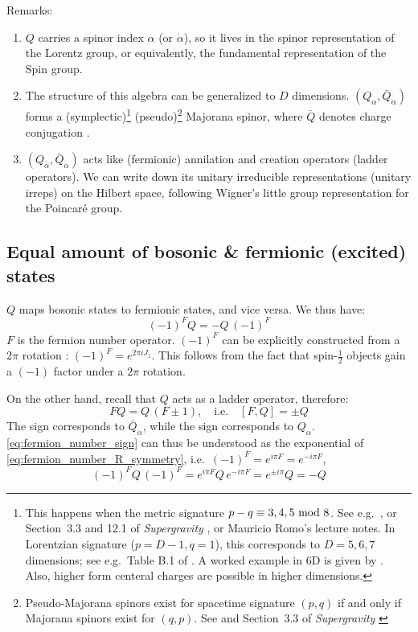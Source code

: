 \documentclass[a4paper
	,10pt
]{article}
\begin{document}
	Remarks:
	\begin{enumerate}
	\item $Q$ carries a spinor index $\alpha$ (or $\dot{\alpha}$), so it lives in the spinor representation of the Lorentz group, or equivalently, the fundamental representation of the Spin group. 
	
	\item The structure of this algebra can be generalized to $D$ dimensions. $(Q_\alpha, \bar{Q}_{\dot{\alpha}})$ forms a \mbox{(symplectic)}\footnote{
		This happens when the metric signature $p - q \equiv 3,4,5\,\operatorname{mod}\,8$. See e.g.~\textcite{figueroa2015majorana}, or Section~3.3 and 12.1 of \textit{Supergravity} \cite{Freedman:2012zz}, or Mauricio Romo's lecture notes. In Lorentzian signature ($p = D-1, q = 1$), this corresponds to $D = 5,6,7$ dimensions; see e.g.~Table B.1 of \textcite{Polchinski:1998rq}. A worked example in 6D is given by \cite{Gustavsson:2001uw}. Also, higher form centeral charges are possible in higher dimensions. 
	} (pseudo)\footnote{
		Pseudo-Majorana spinors exist for spacetime signature $(p,q)$ if and only if Majorana spinors exist for $(q,p)$. See \textcite{figueroa2015majorana} and Section~3.3 of \textit{Supergravity} \cite{Freedman:2012zz}
	} Majorana spinor, where $\bar{Q}$ denotes charge conjugation \cite{Freedman:2012zz}. 
	
	\item $(Q_\alpha, \bar{Q}_{\dot{\alpha}})$ acts like (fermionic) annilation and creation operators (ladder operators). We can write down its unitary irreducible representations (unitary irreps) on the Hilbert space, following Wigner's little group representation for the Poincar\'e group. 
	\end{enumerate}
\subsection{Equal amount of bosonic \& fermionic (excited) states}
	$Q$ maps bosonic states to fermionic states, and vice versa. We thus have:
	\begin{equation}
		(-1)^F Q = - Q\,(-1)^F
	\label{eq:fermion_number_sign}
	\end{equation}
	$F$ is the fermion number operator. $(-1)^F$ can be explicitly constructed from a $2\pi$ rotation \cite{Argyres:1996abc,Witten:1982df}: \mbox{$
		(-1)^F = e^{2\pi i J_z}
	$}. This follows from the fact that spin-$\frac{1}{2}$ objects gain a $(-1)$ factor under a $2\pi$ rotation. 
	
	On the other hand, recall that $Q$ acts as a ladder operator, therefore:
	\begin{equation}
		F Q = Q\,(F \pm 1),
	\quad\text{i.e.}\quad
		[F, Q] = \pm Q
	\label{eq:fermion_number_R_symmetry}
	\end{equation}
	The \mquote{+} sign corresponds to $\bar{Q}_{\dot{\alpha}}$, while the \mquote{-} sign corresponds to $Q_\alpha$. 
	\eqref{eq:fermion_number_sign} can thus be understood as the exponential of \eqref{eq:fermion_number_R_symmetry}, i.e.\ $(-1)^F = e^{i\pi F} = e^{-i\pi F}$,
	\begin{equation}
		(-1)^F Q\,(-1)^F
		= e^{i\pi F} Q\,e^{-i\pi F}
		= e^{\pm i\pi} Q
		= -Q
	\end{equation}
	
\end{document}
